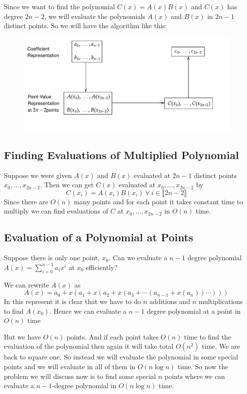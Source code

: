 Since we want to find the polynomial $C(x)=A(x)B(x)$ and $C(x)$ has degree $2n-2$, we will evaluate the polynomials $A(x)$ and $B(x)$ in $2n-1$ distinct points. So we will have the algorithm like this:
\begin{figure}[h]
	\centering
	\includegraphics{images/poly-mult}
\end{figure}
\subsection{Finding Evaluations of Multiplied Polynomial}

Suppose we were given $A(x)$ and $B(x)$ evaluated at $2n-1$ distinct points $x_0,\dots, x_{2n-2}$. Then we can get $C(x)$ evaluated at $x_0,\dots, x_{2n-2}$ by $$C(x_i)=A(x_i)B(x_i)\ \forall\ i\in \llbracket 2n-2\rrbracket$$Since there are $O(n)$ many points and for each point it takes constant time to multiply we can find evaluations of $C$ at $x_0,\dots, x_{2n-2}$ in $ O(n)$ time.
\subsection{Evaluation of a Polynomial at Points}\label{fft}
\begin{question}{}{}
	Suppose there is only one point, $x_0$. Can we evaluate a $n-1$ degree polynomial $A(x)=\sum\limits_{i=0}^{n-1}a_ix^i$ at $x_0$ efficiently?
\end{question}
We can rewrite $A(x)$ as $$A(x)=a_0+x(a_1+x(a_2+x(a_3+\cdots (a_{n-1}+x(a_n))\cdots )))$$In this represent it is clear that we have to do $n$ additions and $n$ multiplications to find $A(x_0)$. Hence we can evaluate a $n-1$ degree polynomial at a point in $O(n)$ time


But we have $O(n)$ points. And if each point takes $O(n)$ time to find the evaluation of the polynomial then again it will take total $O(n^2)$ time. We are back to square one. So instead we will evaluate the polynomial in some special points and we will evaluate in all of them in $O(n\log n)$ time. So now the problem we will discuss now is to find some special $n$ points where we can evaluate a $n-1$-degree polynomial in $O(n\log n)$ time.
\parinf

